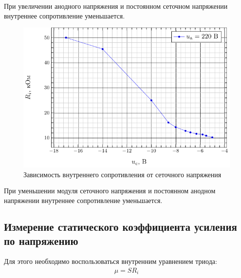 \documentclass[a5paper,11pt]{extarticle}
\begin{document}
При увеличении анодного напряжения и постоянном сеточном напряжении внутреннее сопротивление уменьшается. 
\begin{figure}[H]
	\centering
	\includegraphics[]{fig/r_from_uc.pdf}
	\vspace{-1em}
	\caption{Зависимость внутреннего сопротивления от сеточного напряжения}
	\label{fig:1}
\end{figure}

При уменьшении модуля сеточного напряжения и постоянном анодном напряжении внутреннее сопротивление уменьшается.
\subsection{Измерение статического коэффициента усиления по напряжению} 
Для этого необходимо воспользоваться внутренним уравнением триода:
\begin{gather}
	\mu = S R_i
\end{gather}
\end{document}
